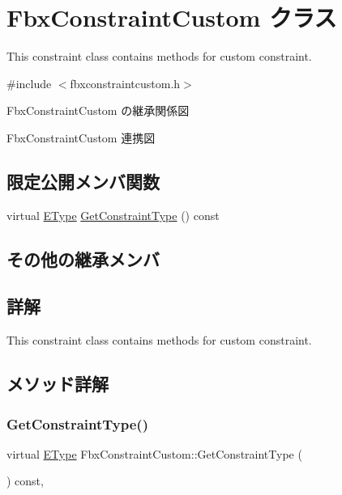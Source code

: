 \hypertarget{class_fbx_constraint_custom}{}\section{Fbx\+Constraint\+Custom クラス}
\label{class_fbx_constraint_custom}


This constraint class contains methods for custom constraint.  




{\ttfamily \#include $<$fbxconstraintcustom.\+h$>$}



Fbx\+Constraint\+Custom の継承関係図


Fbx\+Constraint\+Custom 連携図
\subsection*{限定公開メンバ関数}
\begin{DoxyCompactItemize}
\item 
virtual \hyperlink{class_fbx_constraint_a49c1634663395eab7c28856df233ec66}{E\+Type} \hyperlink{class_fbx_constraint_custom_a80bc6e130ef40b27e4621e1a54b22eb8}{Get\+Constraint\+Type} () const
\end{DoxyCompactItemize}
\subsection*{その他の継承メンバ}


\subsection{詳解}
This constraint class contains methods for custom constraint. 

\subsection{メソッド詳解}
\mbox{\label{class_fbx_constraint_custom_a80bc6e130ef40b27e4621e1a54b22eb8}} 
\subsubsection{\texorpdfstring{Get\+Constraint\+Type()}{GetConstraintType()}}
{\footnotesize\ttfamily virtual \hyperlink{class_fbx_constraint_a49c1634663395eab7c28856df233ec66}{E\+Type} Fbx\+Constraint\+Custom\+::\+Get\+Constraint\+Type (\begin{DoxyParamCaption}{ }\end{DoxyParamCaption}) const\hspace{0.3cm}{\ttfamily [protected]}, {\ttfamily [virtual]}}

